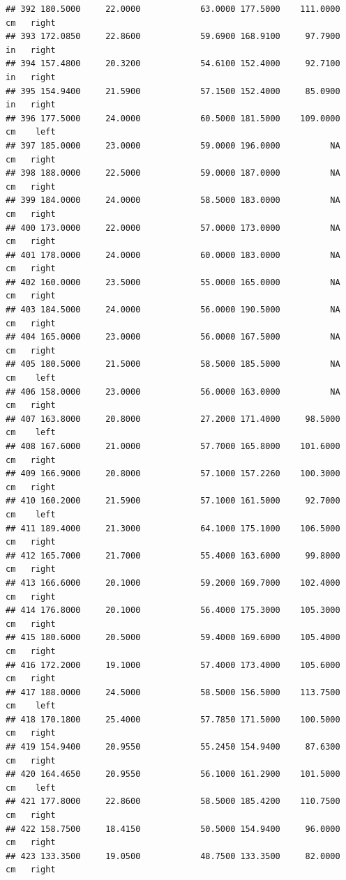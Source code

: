 \documentclass[]{article}
\begin{document}
\begin{verbatim}
## 392 180.5000     22.0000            63.0000 177.5000    111.0000     cm   right
## 393 172.0850     22.8600            59.6900 168.9100     97.7900     in   right
## 394 157.4800     20.3200            54.6100 152.4000     92.7100     in   right
## 395 154.9400     21.5900            57.1500 152.4000     85.0900     in   right
## 396 177.5000     24.0000            60.5000 181.5000    109.0000     cm    left
## 397 185.0000     23.0000            59.0000 196.0000          NA     cm   right
## 398 188.0000     22.5000            59.0000 187.0000          NA     cm   right
## 399 184.0000     24.0000            58.5000 183.0000          NA     cm   right
## 400 173.0000     22.0000            57.0000 173.0000          NA     cm   right
## 401 178.0000     24.0000            60.0000 183.0000          NA     cm   right
## 402 160.0000     23.5000            55.0000 165.0000          NA     cm   right
## 403 184.5000     24.0000            56.0000 190.5000          NA     cm   right
## 404 165.0000     23.0000            56.0000 167.5000          NA     cm   right
## 405 180.5000     21.5000            58.5000 185.5000          NA     cm    left
## 406 158.0000     23.0000            56.0000 163.0000          NA     cm   right
## 407 163.8000     20.8000            27.2000 171.4000     98.5000     cm    left
## 408 167.6000     21.0000            57.7000 165.8000    101.6000     cm   right
## 409 166.9000     20.8000            57.1000 157.2260    100.3000     cm   right
## 410 160.2000     21.5900            57.1000 161.5000     92.7000     cm    left
## 411 189.4000     21.3000            64.1000 175.1000    106.5000     cm   right
## 412 165.7000     21.7000            55.4000 163.6000     99.8000     cm   right
## 413 166.6000     20.1000            59.2000 169.7000    102.4000     cm   right
## 414 176.8000     20.1000            56.4000 175.3000    105.3000     cm   right
## 415 180.6000     20.5000            59.4000 169.6000    105.4000     cm   right
## 416 172.2000     19.1000            57.4000 173.4000    105.6000     cm   right
## 417 188.0000     24.5000            58.5000 156.5000    113.7500     cm    left
## 418 170.1800     25.4000            57.7850 171.5000    100.5000     cm   right
## 419 154.9400     20.9550            55.2450 154.9400     87.6300     cm   right
## 420 164.4650     20.9550            56.1000 161.2900    101.5000     cm    left
## 421 177.8000     22.8600            58.5000 185.4200    110.7500     cm   right
## 422 158.7500     18.4150            50.5000 154.9400     96.0000     cm   right
## 423 133.3500     19.0500            48.7500 133.3500     82.0000     cm   right

\end{verbatim}
\end{document}
